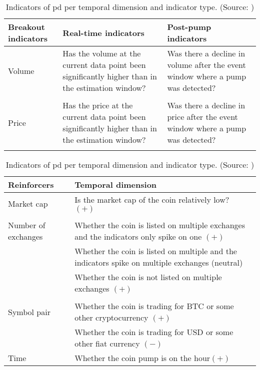 \begin{table}
    \centering
    \begin{tabular}{p{} p{} p{}}
    \hline
    \textbf{Breakout indicators} &\textbf{Real-time indicators} & \textbf{Post-pump indicators}\\
    \hline
    Volume & Has the volume at the current data point been significantly higher than in the estimation window? & Was there a decline in volume after the event window where a pump was detected?\\\\
    Price & Has the price at the current data point been significantly higher than in the estimation window? & Was there a decline in price after the event window where a pump was detected?\\\\
    \end{tabular}
    
    \begin{tabular}{p{} p{}}
    \hline
    \textbf{Reinforcers} &\textbf{Temporal dimension}\\
    \hline
    Market cap & Is the market cap of the coin relatively low? $(+)$\\\\
    Number of exchanges & Whether the coin is listed on multiple exchanges and the indicators only spike on one $(+)$\\
                        & Whether the coin is listed on multiple and the indicators spike on multiple exchanges (neutral)\\
                        & Whether the coin is not listed on multiple exchanges $(+)$\\\\
    Symbol pair         & Whether the coin is trading for BTC or some other cryptocurrency $(+)$\\
                        & Whether the coin is trading for USD or some other fiat currency $(-)$\\
    Time                & Whether the coin pump is on the hour$(+)$\\
    \hline
    \end{tabular}
    \caption{Indicators of \ac{pd} per temporal dimension and indicator type. (Source: \cite{P&D_to_the_moon, P&D_anatomy})}
    \label{tab:pd_indicators}
\end{table}